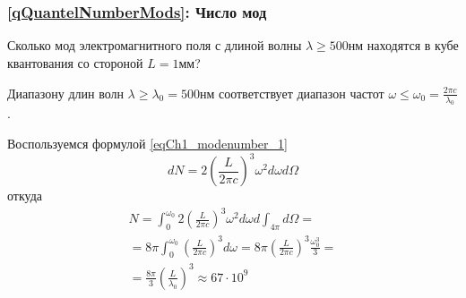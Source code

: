 \chapter{}

\section{} 

\subsection{\ref{qQuantelNumberMods}: Число мод}
Сколько мод электромагнитного поля с длиной волны
  $\lambda \ge 500 \mbox{нм}$ находятся в кубе квантования со стороной
$L=1 \mbox{мм}$?

Диапазону длин волн $\lambda \ge \lambda_0 = 500 \mbox{нм}$
соответствует диапазон частот
$\omega \le \omega_0 = \frac{2 \pi c}{\lambda_0}$.

Воспользуемся формулой \ref{eqCh1_modenumber_1}
\[
d N = 2 \left(\frac{L}{2 \pi c} \right)^3 \omega^2 d \omega d \Omega
\]
откуда
\begin{eqnarray}
  N = \int_0^{\omega_0} 2 \left(\frac{L}{2 \pi c} \right)^3 \omega^2 d
  \omega d \int_{4 \pi} d \Omega =
  \nonumber \\
  = 8 \pi \int_0^{\omega_0} \left(\frac{L}{2 \pi c} \right)^3 d \omega
  = 8 \pi \left(\frac{L}{2 \pi c}\right)^3 \frac{\omega_0^3}{3} =
  \nonumber \\
  = \frac{8 \pi}{3} \left(\frac{L}{\lambda_0}\right)^3 \approx 67
  \cdot 10^9
  \nonumber
\end{eqnarray}


\section{}
